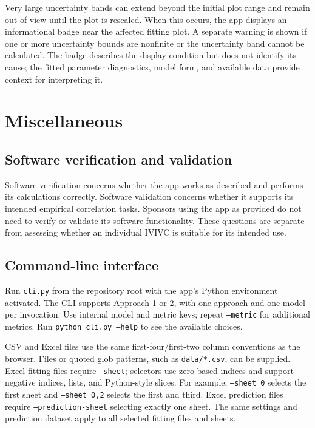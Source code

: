 Very large uncertainty bands can extend beyond the initial plot range and remain out of view until the plot is rescaled. When this occurs, the app displays an informational badge near the affected fitting plot. A separate warning is shown if one or more uncertainty bounds are nonfinite or the uncertainty band cannot be calculated. The badge describes the display condition but does not identify its cause; the fitted parameter diagnostics, model form, and available data provide context for interpreting it.

\section{Miscellaneous}

\subsection{Software verification and validation}

Software verification concerns whether the app works as described and performs its calculations correctly. Software validation concerns whether it supports its intended empirical correlation tasks. Sponsors using the app as provided do not need to verify or validate its software functionality. These questions are separate from assessing whether an individual IVIVC is suitable for its intended use.

\subsection{Command-line interface}

Run \texttt{cli.py} from the repository root with the app's Python environment activated. The CLI supports Approach 1 or 2, with one approach and one model per invocation. Use internal model and metric keys; repeat \texttt{--metric} for additional metrics. Run \texttt{python cli.py --help} to see the available choices.

CSV and Excel files use the same first-four/first-two column conventions as the browser. Files or quoted glob patterns, such as \texttt{data/*.csv}, can be supplied. Excel fitting files require \texttt{--sheet}; selectors use zero-based indices and support negative indices, lists, and Python-style slices. For example, \texttt{--sheet 0} selects the first sheet and \texttt{--sheet 0,2} selects the first and third. Excel prediction files require \texttt{--prediction-sheet} selecting exactly one sheet. The same settings and prediction dataset apply to all selected fitting files and sheets.

